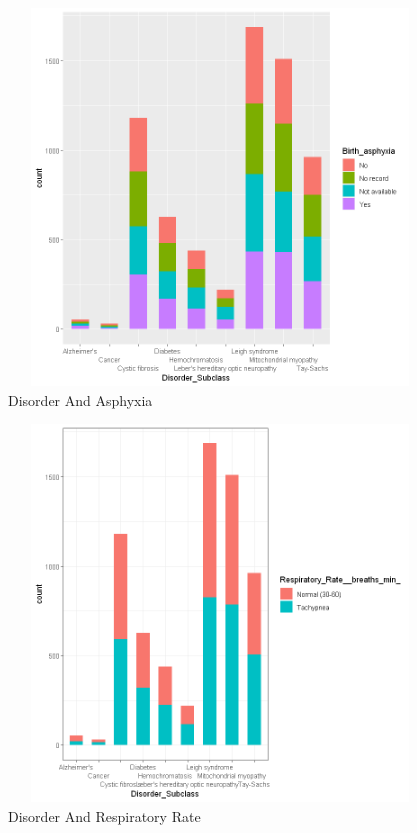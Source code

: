 \begin{figure}[htpb]
	\centering
	\includegraphics[height=10cm, width=12cm]{figures/asphyxia.png}
	\caption{Disorder And Asphyxia}
	\label{fig 13}
\end{figure}

\begin{figure}[htpb]
	\centering
	\includegraphics[height=10cm, width=12cm]{figures/resp.png}
	\caption{Disorder And Respiratory Rate}
	\label{fig 14}
\end{figure}

